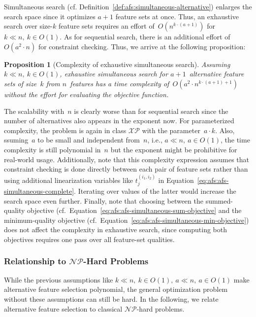 \documentclass{article}
\newtheorem{proposition}{Proposition} %
\theoremstyle{definition}
\begin{document}
Simultaneous search (cf. Definition~\ref{def:afs:simultaneous-alternative}) enlarges the search space since it optimizes $a+1$ feature sets at once.
Thus, an exhaustive search over size-$k$ feature sets requires an effort of~$O(n^{k \cdot (a+1)})$ for~$k \ll n,~k \in O(1)$.
As for sequential search, there is an additional effort of~$O(a^2 \cdot n)$ for constraint checking.
Thus, we arrive at the following proposition:
%
\begin{proposition}[Complexity of exhaustive simultaneous search]
	Assuming $k \ll n,~k \in O(1)$, exhaustive simultaneous search for $a + 1$~alternative feature sets of size~$k$ from $n$~features has a time complexity of~$O(a^2 \cdot n^{k \cdot (a+1) + 1})$ without the effort for evaluating the objective function.
	\label{prop:afs:complexity-exhaustive-simultaneuos}
\end{proposition}
%
The scalability with~$n$ is clearly worse than for sequential search since the number of alternatives also appears in the exponent now.
For parameterized complexity, the problem is again in class $\mathcal{XP}$ with the parameter~$a \cdot k$.
Also, ssuming~$a$ to be small and independent from~$n$, i.e., $a \ll n,~a \in O(1)$, the time complexity is still polynomial in~$n$ but the exponent might be prohibitive for real-world usage.
Additionally, note that this complexity expression assumes that constraint checking is done directly between each pair of feature sets rather than using additional linearization variables like $t^{(i_1,i_2)}_j$ in Equation~\ref{eq:afs:afs-simultaneous-complete}.
Iterating over values of the latter would increase the search space even further.
Finally, note that choosing between the summed-quality objective (cf.~Equation~\ref{eq:afs:afs-simultaneous-sum-objective} and the minimum-quality objective (cf.~Equation~\ref{eq:afs:afs-simultaneous-min-objective}) does not affect the complexity in exhaustive search, since computing both objectives requires one pass over all feature-set qualities.

\subsubsection{Relationship to \texorpdfstring{$\mathcal{NP}$}{NP}-Hard Problems}
\label{sec:afs:appendix:complexity:np}

While the previous assumptions like $k \ll n,~k \in O(1),~a \ll n,~a \in O(1)$ make alternative feature selection polynomial, the general optimization problem without these assumptions can still be hard.
In the following, we relate alternative feature selection to classical $\mathcal{NP}$-hard problems.
\end{document}
